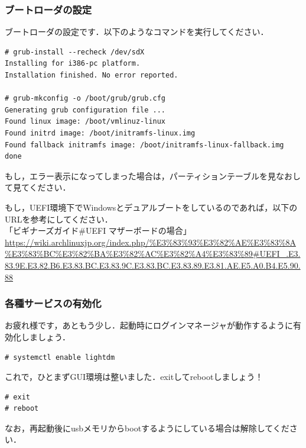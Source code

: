 \documentclass[b5j,twoside,openany]{jsbook}
\begin{document}
    \subsubsection{ブートローダの設定}
      ブートローダの設定です．以下のようなコマンドを実行してください．
      \begin{screen}
\begin{verbatim}
# grub-install --recheck /dev/sdX
Installing for i386-pc platform.
Installation finished. No error reported.

# grub-mkconfig -o /boot/grub/grub.cfg
Generating grub configuration file ...
Found linux image: /boot/vmlinuz-linux
Found initrd image: /boot/initramfs-linux.img
Found fallback initramfs image: /boot/initramfs-linux-fallback.img
done
\end{verbatim}
      \end{screen}
      もし，エラー表示になってしまった場合は，パーティションテーブルを見なおして見てください．

      \begin{boxnote}
        もし，UEFI環境下でWindowsとデュアルブートをしているのであれば，以下のURLを参考にしてください．\\

        「ビギナーズガイド\#UEFI マザーボードの場合」\\
        \url{https://wiki.archlinuxjp.org/index.php/%E3%83%93%E3%82%AE%E3%83%8A%E3%83%BC%E3%82%BA%E3%82%AC%E3%82%A4%E3%83%89#UEFI_.E3.83.9E.E3.82.B6.E3.83.BC.E3.83.9C.E3.83.BC.E3.83.89.E3.81.AE.E5.A0.B4.E5.90.88}\\

      \end{boxnote}

    \subsubsection{各種サービスの有効化}
      お疲れ様です，あともう少し．起動時にログインマネージャが動作するように有効化しましょう．
      \begin{screen}
\begin{verbatim}
# systemctl enable lightdm
\end{verbatim}
      \end{screen}
      これで，ひとまずGUI環境は整いました．exitしてrebootしましょう！
      \begin{screen}
\begin{verbatim}
# exit
# reboot
\end{verbatim}
      \end{screen}
      なお，再起動後にusbメモリからbootするようにしている場合は解除してください．
\end{document}
